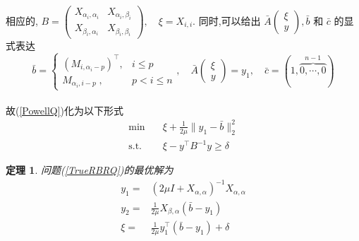 \documentclass[a4paper, UTF8]{ctexart}				%
\newtheorem{theo}{\bf 定理}[section]			  %
\numberwithin{equation}{section}				%
\begin{document}
			\paragraph{}
				\quad 相应的,
				$
						B 
					=	\begin{pmatrix}
							X_{\alpha_i, \alpha_i} & X_{\alpha_i, \beta_i} \\
							X_{\beta_i, \alpha_i} & X_{\beta_i, \beta_i}
						\end{pmatrix} ,\quad 
						\xi
					=	X_{i, i}
				$.
				同时,可以给出 $\bar{A} \begin{pmatrix}\xi \\ y\end{pmatrix}, \bar{b}$ 和 $\bar{c}$ 的显式表达
				\begin{equation}\label{BigRBRCondition2}
						\bar{b}
					= 	\begin{cases}
							(M_{i,\alpha_i-p})^\top,&i\leq p\\
							M_{\alpha_i,i-p}\;,&p<i\leq n
						\end{cases}
						, \quad
						\bar{A} \begin{pmatrix} \xi \\ y \end{pmatrix}
					=	y_1
						, \quad
						\bar{c}
					=	(1, \overbrace{0, \cdots, 0}^{n - 1})
				\end{equation}

			\paragraph{}
				\quad 故(\ref{PowellQ})化为以下形式
				\begin{equation}
					\begin{split}\label{TrueRBRQ}
						\min \quad
							& \xi + \frac{1}{2\mu} \lVert{y_1 - \bar{b}}\rVert^2_2\\
						\text{s.t.} \quad
							& \xi - y^\top B^{-1} y \geq \delta
					\end{split}
				\end{equation}

			\begin{theo}
				问题(\ref{TrueRBRQ})的最优解为
				\begin{equation}
					\begin{split}\label{TrueRBRA}
						y_1 = & (2 \mu I + X_{\alpha, \alpha})^{-1} X_{\alpha, \alpha}\\
						y_2 = & \frac{1}{2 \mu} X_{\beta, \alpha} (\bar{b} - y_1)\\
						\xi = & \frac{1}{2 \mu} y_1^\top (\bar{b} - y_1) + \delta
					\end{split}
				\end{equation}
			\end{theo}
\end{document}
